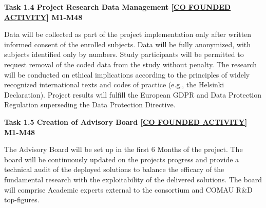 \begin{planactivitybody}
\plantaskskip
\textbf{Task 1.4 Project Research Data Management {[}\ul{CO FOUNDED
ACTIVITY}{]} M1-M48}

Data will be collected as part of the project implementation only after
written informed consent of the enrolled subjects. Data will be fully
anonymized, with subjects identified only by numbers. Study participants
will be permitted to request removal of the coded data from the study
without penalty. The research will be conducted on ethical implications
according to the principles of widely recognized international texts and
codes of practice (e.g., the Helsinki Declaration). Project results will
fulfill the European GDPR and Data Protection Regulation superseding the
Data Protection Directive.

\plantaskskip
\textbf{Task 1.5 Creation of Advisory Board {[}\ul{CO FOUNDED
ACTIVITY}{]} M1-M48}

The Advisory Board will be set up in the first 6 Months of the project.
The board will be continuously updated on the project\textquotesingle s
progress and provide a technical audit of the deployed solutions to
balance the efficacy of the fundamental research with the exploitability
of the delivered solutions. The board will comprise Academic experts
external to the consortium and COMAU R\&D top-figures.
\end{planactivitybody}


